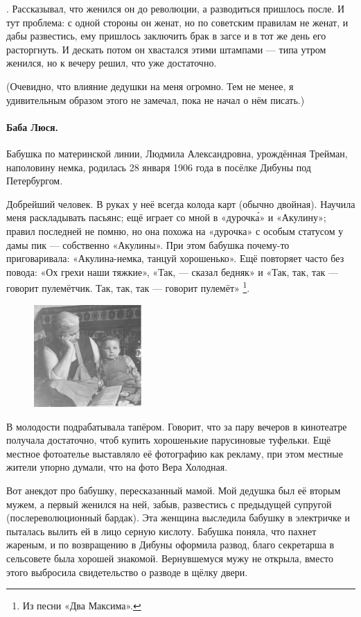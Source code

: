 \documentclass{book}
\begin{document}
.
Рассказывал, что женился он до революции, а разводиться пришлось после.
И тут проблема: с одной стороны он женат, но по советским правилам не женат,
и дабы развестись, ему пришлось заключить брак в загсе и в тот же день его расторгнуть.
И дескать потом он хвастался этими штампами ---
типа утром женился, но к вечеру решил, что уже достаточно.

(Очевидно, что влияние дедушки на меня огромно.
Тем не менее, я удивительным образом этого не замечал, пока не начал о нём писать.)

\paragraph{Баба Люся.}
Бабушка по материнской линии, Людмила Александровна, урождённая Трейман, наполовину немка, родилась 28 января 1906 года в посёлке Дибуны под Петербургом.

Добрейший человек.
В руках у неё всегда колода карт (обычно двойная).
Научила меня раскладывать пасьянс;  ещё играет со мной в «дурочк\'{а}» и
«Акулину»;
правил последней не помню, но она похожа на «дурочка» с особым статусом у дамы пик --- собственно «Акулины».
При этом бабушка почему-то приговаривала: «Акулина-немка, танцуй хорошенько».
Ещё повторяет часто без повода: «Ох грехи наши тяжкие»,
«Так, --- сказал бедняк»
и «Так, так, так --- говорит пулемётчик. Так, так, так --- говорит пулемёт»%
\footnote{Из песни «Два Максима».}.

\begin{figure}
\vskip-4mm
\centering
\includegraphics[width=41mm,angle=0]{pics/baba-lyusya-tosha}
\end{figure}

В молодости подрабатывала тапёром.
Говорит, что за пару вечеров в кинотеатре получала достаточно, чтоб купить хорошенькие парусиновые туфельки.
Ещё местное фотоателье выставляло её фотографию как рекламу, при этом местные жители упорно думали, что на фото Вера Холодная.

Вот анекдот про бабушку, пересказанный мамой.
Мой дедушка был её вторым мужем, а первый женился на ней, забыв, развестись с предыдущей супругой (послереволюционный бардак).
Эта женщина выследила бабушку в электричке и пыталась вылить ей в лицо серную кислоту.
Бабушка поняла, что пахнет жареным, и по возвращению в Дибуны оформила развод, благо секретарша в сельсовете была хорошей знакомой.
Вернувшемуся мужу не открыла, вместо этого выбросила свидетельство о разводе в щёлку двери.
\end{document}

